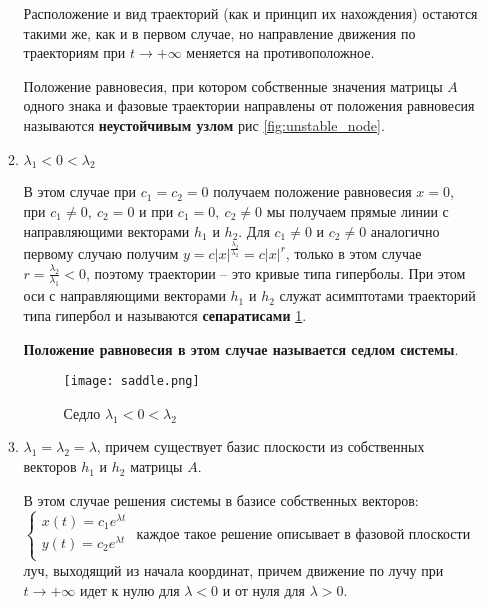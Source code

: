 \begin{enumerate}
\begin{enumerate}
    Расположение и вид траекторий (как и принцип их нахождения) остаются такими же, как и в первом случае, но направление движения по траекториям при $t \rightarrow +\infty$ меняется на противоположное.
    
    \begin{definition}
    	Положение равновесия, при котором собственные значения матрицы $A$ одного знака и фазовые траектории направлены от положения равновесия называются \textbf{неустойчивым узлом} рис \ref{fig:unstable_node}.
    \end{definition}
    
    \item $\lambda_1 < 0 < \lambda_2$
    
    В этом случае при $c_1 = c_2 = 0$ получаем положение равновесия $x = 0$, при $c_1 \neq 0, ~ c_2 = 0$ и при $c_1 = 0, ~ c_2 \neq 0$ мы получаем прямые линии с направляющими векторами $h_1$ и $h_2$. Для $c_1 \neq 0$ и $c_2 \neq 0$ аналогично первому случаю получим $\displaystyle y = c |x|^{\frac{\lambda_2}{\lambda_2}} = c |x|^r$, только в этом случае $\displaystyle r = \frac{\lambda_2}{\lambda_1} < 0$, поэтому траектории -- это кривые типа гиперболы. При этом оси с направляющими векторами $h_1$ и $h_2$ служат асимптотами траекторий типа гипербол и называются \textbf{сепаратисами} \ref{fig:saddle}.
    
    \textbf{Положение равновесия в этом случае называется седлом системы}.
    
    \begin{figure}[h!]
    	\centering
    	\texttt{[image: saddle.png]}
    	\caption{Седло $\lambda_1 < 0 < \lambda_2$}
    	\label{fig:saddle}
    \end{figure}

    \item $\lambda_1 = \lambda_2 = \lambda$, причем существует базис плоскости из собственных векторов $h_1$ и $h_2$ матрицы $A$.
    
    В этом случае решения системы в базисе собственных векторов:
    $\begin{cases}
    	x(t) = c_1 e^{\lambda t} \\
    	y(t) = c_2 e^{\lambda t} \\
    \end{cases}$
    каждое такое решение описывает в фазовой плоскости луч, выходящий из начала координат, причем движение по лучу при $t \rightarrow + \infty$ идет к нулю для $\lambda < 0$ и от нуля для $\lambda > 0$.
    

\end{enumerate}
\end{enumerate}
